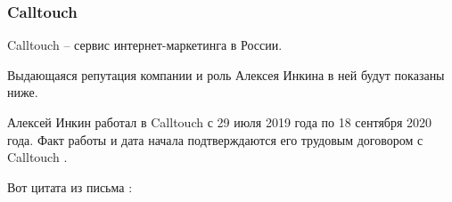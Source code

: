 \subsubsection{Calltouch}
\label{subsubsec:RoleCalltouch}


Calltouch -- сервис интернет-маркетинга в России.

Выдающаяся репутация компании и роль Алексея Инкина в ней
будут показаны ниже.


Алексей Инкин работал в Calltouch с 29 июля 2019 года по 18 сентября 2020 года.
Факт работы и дата начала подтверждаются его трудовым договором с Calltouch .



Вот цитата из письма \MrCalltouchT:

